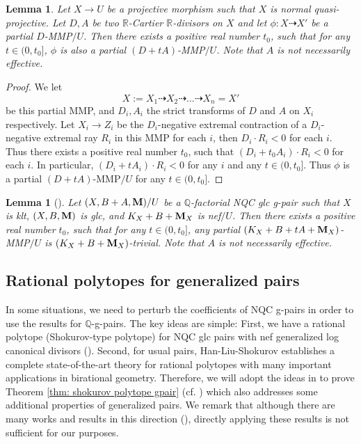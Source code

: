 \documentclass[11pt]{amsart}
\numberwithin{equation}{section}
\newcommand{\Mm}{{\bf{M}}}
\newcommand{\Qq}{\mathbb{Q}}
\newcommand{\Rr}{\mathbb{R}}
\newtheorem{lem}[thm]{Lemma}
\theoremstyle{definition}
\theoremstyle{definition}
\theoremstyle{definition}
\begin{document}
\begin{lem}\label{lem: still an mmp under perturbation}
Let $X\rightarrow U$ be a projective morphism such that $X$ is normal quasi-projective. Let $D,A$ be two $\Rr$-Cartier $\Rr$-divisors on $X$ and let $\phi: X\dashrightarrow X'$ be a partial $D$-MMP$/U$. Then there exists a positive real number $t_0$, such that for any $t\in (0,t_0]$, $\phi$ is also a partial $(D+tA)$-MMP$/U$. Note that $A$ is not necessarily effective.
\end{lem}
\begin{proof}
We let
$$X:=X_1\dashrightarrow X_2\dashrightarrow\dots\dashrightarrow X_n=X'$$
be this partial MMP, and $D_i,A_i$ the strict transforms of $D$ and $A$ on $X_i$ respectively. Let $X_i\rightarrow Z_i$ be the $D_i$-negative extremal contraction of a $D_i$-negative extremal ray $R_i$ in this MMP for each $i$, then $D_i\cdot R_i<0$ for each $i$. Thus there exists a positive real number $t_0$, such that $(D_i+t_0A_i)\cdot R_i<0$ for each $i$. In particular, $(D_i+tA_i)\cdot R_i<0$ for any $i$ and any $t\in (0,t_0]$. Thus $\phi$ is a partial $(D+tA)$-MMP$/U$ for any $t\in (0,t_0]$.
\end{proof}




\begin{lem}[{\cite[Lemma 3.17]{HL18}}]\label{lem: trivial mmp under perturbation}
Let $(X,B+A,\Mm)/U$ be a $\Qq$-factorial NQC glc g-pair such that $X$ is klt, $(X,B,\Mm)$ is glc, and $K_X+B+\Mm_X$ is nef$/U$. Then there exists a positive real number $t_0$, such that for any $t\in (0,t_0]$, any partial $(K_X+B+tA+\Mm_X)$-MMP$/U$ is $(K_X+B+\Mm_X)$-trivial. Note that $A$ is not necessarily effective.
\end{lem}




\subsection{Rational polytopes for generalized pairs}

In some situations, we need to perturb the coefficients of NQC g-pairs in order to use the results for $\Qq$-g-pairs.  The key ideas are simple: First, we have a rational polytope (Shokurov-type polytope) for NQC glc pairs with nef generalized log canonical divisors (\cite[3.3]{HL18}). Second, for usual pairs, Han-Liu-Shokurov establishes a complete state-of-the-art theory for rational polytopes \cite[Section 5]{HLS19} with many important applications in birational geometry. Therefore, we will adopt the ideas in \cite{HLS19} to prove Theorem \ref{thm: shokurov polytope gpair} (cf. \cite[3.3]{HL18}) which also addresses some additional properties of generalized pairs. We remark that although there are many works and results in this direction (\cite{HL18,HL19,HL20d,Che20}), directly applying these results is not sufficient for our purposes.
\end{document}
